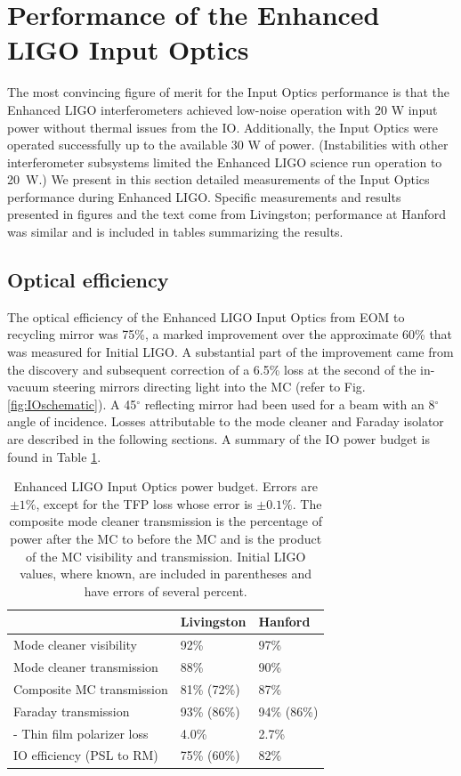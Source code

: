 \section{Performance of the Enhanced LIGO Input Optics}
\label{sec:performance}
The most convincing figure of merit for the Input Optics performance
is that the Enhanced LIGO interferometers achieved low-noise operation
with 20 W input power without thermal issues from the
IO. Additionally, the Input Optics were operated successfully up to
the available 30 W of power.  (Instabilities with other interferometer
subsystems limited the Enhanced LIGO science run operation to 20~W.)
We present in this section detailed measurements of the Input Optics
performance during Enhanced LIGO. Specific measurements and results
presented in figures and the text come from Livingston; performance at
Hanford was similar and is included in tables summarizing the results.



\subsection{Optical efficiency}
The optical efficiency of the Enhanced LIGO Input Optics from EOM to
recycling mirror was 75\%, a marked improvement over the approximate
60\% that was measured for Initial LIGO. A substantial part of the
improvement came from the discovery and subsequent correction of a
6.5\% loss at the second of the in-vacuum steering mirrors directing
light into the MC (refer to Fig. \ref{fig:IOschematic}). A 45$^\circ$
reflecting mirror had been used for a beam with an 8$^\circ$ angle of
incidence. Losses attributable to the mode cleaner and Faraday
isolator are described in the following sections. A summary of the IO
power budget is found in Table \ref{tab:pwrbudget}.

\begin{table}
\centering
\caption[Enhanced LIGO Input Optics power budget.]{Enhanced LIGO Input
  Optics power budget. Errors are $\pm 1\%$, except for the TFP loss
  whose error is $\pm 0.1\%$. The 
  composite mode cleaner transmission is the percentage of power after the MC to
  before the MC and is the product of the MC visibility and
  transmission. Initial LIGO values,
  where known, are included in parentheses and have errors of several percent.}
\begin{tabular}{l l l}
\hline
 & Livingston & Hanford \\
\hline
Mode cleaner visibility & 92\% & 97\% \\
Mode cleaner transmission & 88\% & 90\% \\
Composite MC transmission & 81\% (72\%) & 87\% \\
Faraday transmission &       93\% (86\%) & 94\% (86\%) \\
\hspace{0.5cm} - Thin film polarizer loss & 4.0\% & 2.7\% \\ 
IO efficiency (PSL to RM) & 75\% (60\%) & 82\% \\
\hline
\end{tabular}
\label{tab:pwrbudget}
\end{table}


